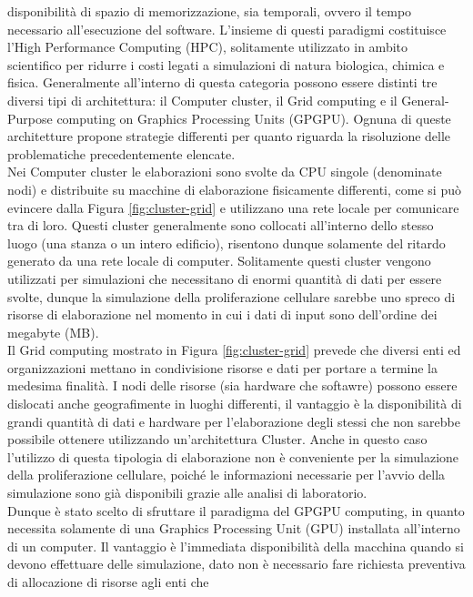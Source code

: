 disponibilità di spazio di memorizzazione, sia temporali, ovvero il tempo 
necessario all'esecuzione del software. L'insieme di questi paradigmi 
costituisce l'High Performance Computing (HPC), solitamente utilizzato in 
ambito scientifico per ridurre i costi legati a simulazioni di natura 
biologica, chimica e fisica.
Generalmente all'interno di questa categoria possono essere distinti tre 
diversi tipi di architettura: il Computer cluster, il Grid computing e 
il General-Purpose computing on Graphics Processing Units (GPGPU).
Ognuna di queste architetture propone strategie differenti per quanto riguarda 
la risoluzione delle problematiche precedentemente elencate.
\\
Nei Computer cluster le elaborazioni sono svolte da CPU singole
(denominate nodi) e distribuite su macchine di elaborazione fisicamente 
differenti, come si può evincere dalla Figura \ref{fig:cluster-grid} 
e utilizzano una rete locale per comunicare tra di loro. Questi cluster
generalmente sono collocati all'interno dello stesso luogo
(una stanza o un intero edificio), risentono dunque solamente del ritardo generato
da una rete locale di computer. Solitamente questi cluster vengono utilizzati 
per simulazioni che necessitano di enormi quantità di dati per essere svolte, 
dunque la simulazione della proliferazione 
cellulare sarebbe uno spreco di risorse di elaborazione nel momento in cui i 
dati di input sono dell'ordine dei megabyte (MB).
\\
Il Grid computing mostrato in Figura \ref{fig:cluster-grid}
prevede che diversi enti ed organizzazioni mettano in condivisione risorse e
dati per portare a termine la medesima finalità.
I nodi delle risorse (sia hardware che softawre) possono essere
dislocati anche geografimente in luoghi differenti, 
il vantaggio è la disponibilità di grandi
quantità di dati e hardware per l'elaborazione degli stessi che non sarebbe
possibile ottenere utilizzando un'architettura Cluster. Anche in questo caso 
l'utilizzo di questa tipologia di elaborazione non è conveniente per la 
simulazione della proliferazione cellulare, poiché le informazioni necessarie 
per l'avvio della simulazione sono già disponibili grazie alle analisi di 
laboratorio.
\\
Dunque è stato scelto di sfruttare il paradigma del GPGPU computing, in quanto 
necessita solamente di una Graphics Processing Unit (GPU) installata 
all'interno di un computer. Il vantaggio è l'immediata disponibilità della 
macchina quando si devono effettuare delle simulazione, dato non è 
necessario fare richiesta preventiva di allocazione di risorse agli enti che 

